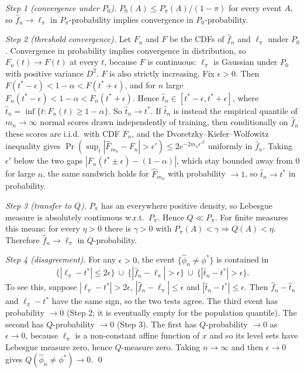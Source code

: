 \emph{Step 1 (convergence under $P_0$).} $P_0(A)\le P_\pi(A)/(1-\pi)$ for every event $A$, so $\hat f_n\to\ell_\pi$ in $P_\pi$-probability implies convergence in $P_0$-probability.

\emph{Step 2 (threshold convergence).} Let $F_n$ and $F$ be the CDFs of $\hat f_n$ and $\ell_\pi$ under $P_0$. Convergence in probability implies convergence in distribution, so $F_n(t)\to F(t)$ at every $t$, because $F$ is continuous: $\ell_\pi$ is Gaussian under $P_0$ with positive variance $D^2$. $F$ is also strictly increasing. Fix $\epsilon>0$. Then $F(t^*-\epsilon)<1-\alpha<F(t^*+\epsilon)$, and for $n$ large $F_n(t^*-\epsilon)<1-\alpha<F_n(t^*+\epsilon)$. Hence $\hat t_n\in[t^*-\epsilon,t^*+\epsilon]$, where $\hat t_n=\inf\{t:F_n(t)\ge1-\alpha\}$. So $\hat t_n\to t^*$. If $\hat t_n$ is instead the empirical quantile of $m_n\to\infty$ normal scores drawn independently of training, then conditionally on $\hat f_n$ these scores are i.i.d.\ with CDF $F_n$, and the Dvoretzky--Kiefer--Wolfowitz inequality \citep{massart1990} gives $\Pr(\sup_t|\hat F_{m_n}-F_n|>\epsilon')\le2e^{-2m_n\epsilon'^2}$ uniformly in $\hat f_n$. Taking $\epsilon'$ below the two gaps $|F_n(t^*\pm\epsilon)-(1-\alpha)|$, which stay bounded away from $0$ for large $n$, the same sandwich holds for $\hat F_{m_n}$ with probability $\to1$, so $\hat t_n\to t^*$ in probability.

\emph{Step 3 (transfer to $Q$).} $P_\pi$ has an everywhere positive density, so Lebesgue measure is absolutely continuous w.r.t.\ $P_\pi$. Hence $Q\ll P_\pi$. For finite measures this means: for every $\eta>0$ there is $\gamma>0$ with $P_\pi(A)<\gamma\Rightarrow Q(A)<\eta$. Therefore $\hat f_n\to\ell_\pi$ in $Q$-probability.

\emph{Step 4 (disagreement).} For any $\epsilon>0$, the event $\{\hat\phi_n\ne\phi^*\}$ is contained in
\[
\{|\ell_\pi-t^*|\le2\epsilon\}\ \cup\ \{|\hat f_n-\ell_\pi|>\epsilon\}\ \cup\ \{|\hat t_n-t^*|>\epsilon\}.
\]
To see this, suppose $|\ell_\pi-t^*|>2\epsilon$, $|\hat f_n-\ell_\pi|\le\epsilon$ and $|\hat t_n-t^*|\le\epsilon$. Then $\hat f_n-\hat t_n$ and $\ell_\pi-t^*$ have the same sign, so the two tests agree. The third event has probability $\to0$ (Step 2; it is eventually empty for the population quantile). The second has $Q$-probability $\to0$ (Step 3). The first has $Q$-probability $\to0$ as $\epsilon\to0$, because $\ell_\pi$ is a non-constant affine function of $x$ and so its level sets have Lebesgue measure zero, hence $Q$-measure zero. Taking $n\to\infty$ and then $\epsilon\to0$ gives $Q(\hat\phi_n\ne\phi^*)\to0$. \qed

